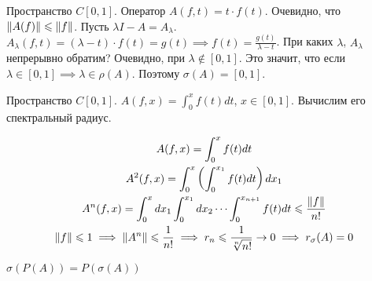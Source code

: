 \begin{example}
    Пространство $C[0, 1]$. Оператор $A(f, t) = t \cdot f(t)$. Очевидно, что 
    $\left\|A(f)\right\| \leqslant \left\|f\right\|$. Пусть $\lambda I - A = A_\lambda$.
    $A_\lambda(f, t) = (\lambda - t) \cdot  f(t) = g(t) \implies 
    f(t) = \frac{g(t)}{\lambda - t}$. При каких $\lambda$, $A_\lambda$ непрерывно обратим?
    Очевидно, при $\lambda \notin [0, 1]$. Это значит, что если $\lambda \in [0, 1]  \implies \lambda \in \rho(A)$.
    Поэтому $\sigma(A) = [0, 1]$.
\end{example}

\begin{example}
    Пространство $C[0, 1]$. $A(f, x) = \int_{0}^{x}f(t)dt$, $x \in [0, 1]$.
    Вычислим его спектральный радиус.
    
    \begin{gather*}
        A(f, x) = \int_{0}^{x}f(t)dt \\
        A^2(f, x) = \int_{0}^{x} \left( \int_{0}^{x_1} f(t) dt\right)dx_1 \\
        A^n(f, x) = \int_{0}^{x} dx_1 \int_{0}^{x_1} dx_2 \cdots \int_{0}^{x_{n + 1}} f(t)dt \leqslant 
        \frac{\left\|f\right\|}{n!} \\
        \left\|f\right\| \leqslant 1 \implies \left\|A^n\right\| \leqslant \frac{1}{n!} \implies r_n \leqslant \frac{1}{\sqrt[n]{n!}} \rightarrow 0 
        \implies r_{\sigma}(A) = 0
        \end{gather*}
\end{example}


\begin{theorem}
$\sigma(P(A)) = P(\sigma(A))$
\end{theorem}


